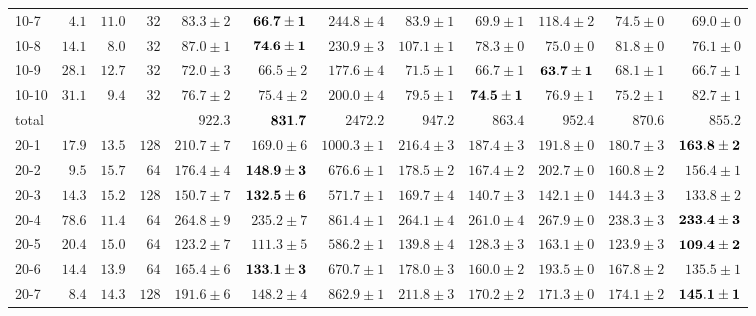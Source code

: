 \documentclass[letterpaper]{article}
\newcommand{\G}{\cellcolor[gray]{0.75}}
\begin{document}
\begin{table}[t]
{\begin{minipage}{7.3in}
\begin{tabular}{l@{}rr@{}r rr rrr rrr}
      10-7  & $ 4.1$ & $11.0$ & $32$ &    $ 83.3\pm2$ &$\bf  66.7\pm1$ &    $244.8\pm4$ &    $ 83.9\pm1$ &    $ 69.9\pm1$ &    $118.4\pm2$ &    $ 74.5\pm0$ &\G  $ 69.0\pm0$ \\
      10-8  & $14.1$ & $ 8.0$ & $32$ &    $ 87.0\pm1$ &$\bf  74.6\pm1$ &    $230.9\pm3$ &    $107.1\pm1$ &    $ 78.3\pm0$ &\G  $ 75.0\pm0$ &    $ 81.8\pm0$ &    $ 76.1\pm0$ \\
      10-9  & $28.1$ & $12.7$ & $32$ &    $ 72.0\pm3$ &    $ 66.5\pm2$ &    $177.6\pm4$ &    $ 71.5\pm1$ &    $ 66.7\pm1$ &\G$\bf63.7\pm1$ &    $ 68.1\pm1$ &    $ 66.7\pm1$ \\
      10-10 & $31.1$ & $ 9.4$ & $32$ &    $ 76.7\pm2$ &    $ 75.4\pm2$ &    $200.0\pm4$ &    $ 79.5\pm1$ &\G$\bf74.5\pm1$ &    $ 76.9\pm1$ &    $ 75.2\pm1$ &    $ 82.7\pm1$ \\
      total &        &      &        &        $922.3$ &$\bf     831.7$ &       $2472.2$ &        $947.2$ &        $863.4$ &        $952.4$ &        $870.6$ &\G      $855.2$ \\
      \midrule
      20-1  & $17.9$ & $13.5$ & $128$&    $210.7\pm7$ &    $169.0\pm6$ &   $1000.3\pm1$ &    $216.4\pm3$ &    $187.4\pm3$ &    $191.8\pm0$ &    $180.7\pm3$ &\G$\bf163.8\pm2$\\
      20-2  & $ 9.5$ & $15.7$ & $64$ &    $176.4\pm4$ &$\bf 148.9\pm3$ &    $676.6\pm1$ &    $178.5\pm2$ &    $167.4\pm2$ &    $202.7\pm0$ &    $160.8\pm2$ &\G  $156.4\pm1$ \\
      20-3  & $14.3$ & $15.2$ & $128$&    $150.7\pm7$ &$\bf 132.5\pm6$ &    $571.7\pm1$ &    $169.7\pm4$ &    $140.7\pm3$ &    $142.1\pm0$ &    $144.3\pm3$ &\G  $133.8\pm2$ \\
      20-4  & $78.6$ & $11.4$ & $64$ &    $264.8\pm9$ &    $235.2\pm7$ &    $861.4\pm1$ &    $264.1\pm4$ &    $261.0\pm4$ &    $267.9\pm0$ &    $238.3\pm3$ &\G$\bf233.4\pm3$\\
      20-5  & $20.4$ & $15.0$ & $64$ &    $123.2\pm7$ &    $111.3\pm5$ &    $586.2\pm1$ &    $139.8\pm4$ &    $128.3\pm3$ &    $163.1\pm0$ &    $123.9\pm3$ &\G$\bf109.4\pm2$\\
      20-6  & $14.4$ & $13.9$ & $64$ &    $165.4\pm6$ &$\bf 133.1\pm3$ &    $670.7\pm1$ &    $178.0\pm3$ &    $160.0\pm2$ &    $193.5\pm0$ &    $167.8\pm2$ &\G  $135.5\pm1$ \\
      20-7  & $ 8.4$ & $14.3$ & $128$&    $191.6\pm6$ &    $148.2\pm4$ &    $862.9\pm1$ &    $211.8\pm3$ &    $170.2\pm2$ &    $171.3\pm0$ &    $174.1\pm2$ &\G$\bf145.1\pm1$\\

\end{tabular}
\end{minipage}}
\end{table}
\end{document}
